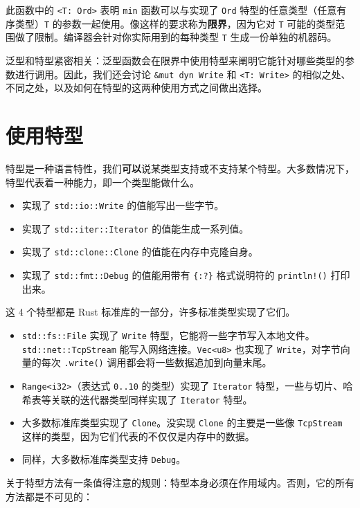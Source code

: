 此函数中的 \texttt{<T: Ord>} 表明 \texttt{min} 函数可以与实现了 \texttt{Ord} 特型的任意类型（任意有序类型）\texttt{T} 的参数一起使用。像这样的要求称为\textbf{限界}，因为它对 \texttt{T} 可能的类型范围做了限制。编译器会针对你实际用到的每种类型 \texttt{T} 生成一份单独的机器码。

泛型和特型紧密相关：泛型函数会在限界中使用特型来阐明它能针对哪些类型的参数进行调用。因此，我们还会讨论 \texttt{\&mut dyn Write} 和 \texttt{<T: Write>} 的相似之处、不同之处，以及如何在特型的这两种使用方式之间做出选择。

\section{使用特型}

特型是一种语言特性，我们\textbf{可以}说某类型支持或不支持某个特型。大多数情况下，特型代表着一种能力，即一个类型能做什么。

\begin{itemize}
\item 实现了 \texttt{std::io::Write} 的值能写出一些字节。
\item 实现了 \texttt{std::iter::Iterator} 的值能生成一系列值。
\item 实现了 \texttt{std::clone::Clone} 的值能在内存中克隆自身。
\item 实现了 \texttt{std::fmt::Debug} 的值能用带有 \texttt{\{:?\}} 格式说明符的 \texttt{println!()} 打印出来。
\end{itemize}

这 4 个特型都是 Rust 标准库的一部分，许多标准类型实现了它们。

\begin{itemize}
\item \texttt{std::fs::File} 实现了 \texttt{Write} 特型，它能将一些字节写入本地文件。\texttt{std::net::TcpStream} 能写入网络连接。\texttt{Vec<u8>} 也实现了 \texttt{Write}，对字节向量的每次 \texttt{.write()} 调用都会将一些数据追加到向量末尾。
\item \texttt{Range<i32>}（表达式 \texttt{0..10} 的类型）实现了 \texttt{Iterator} 特型，一些与切片、哈希表等关联的迭代器类型同样实现了 \texttt{Iterator} 特型。
\item 大多数标准库类型实现了 \texttt{Clone}。没实现 \texttt{Clone} 的主要是一些像 \texttt{TcpStream} 这样的类型，因为它们代表的不仅仅是内存中的数据。
\item 同样，大多数标准库类型支持 \texttt{Debug}。
\end{itemize}

关于特型方法有一条值得注意的规则：特型本身必须在作用域内。否则，它的所有方法都是不可见的：


